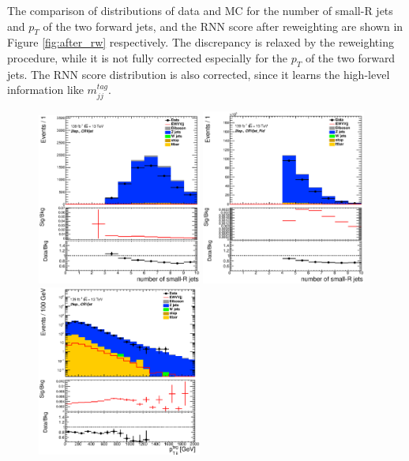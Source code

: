 The comparison of distributions of data and MC for the number of small-R jets and $p_T$ of the two forward jets, and the RNN score after reweighting are shown in Figure \ref{fig:after_rw}
respectively. The discrepancy is relaxed by the reweighting procedure, while it is not fully corrected especially for the $p_T$ of the two forward jets.
The RNN score distribution is also corrected, since it learns the high-level information like $m^{tag}_{jj}$.
\begin{figure}[ht]
    \centering
    \includegraphics[width=0.48\textwidth]{figures/2lep/reweighting/after_reweighting/C_0ptag1pfat0pjet_0ptv_CRVjet_NJets_Lin.eps}
    \includegraphics[width=0.48\textwidth]{figures/2lep/reweighting/after_reweighting/C_0ptag2pjet_0ptv_CRVjet_Fid_NJets_Lin.eps}
    \includegraphics[width=0.48\textwidth]{figures/2lep/reweighting/after_reweighting/C_0ptag1pfat0pjet_0ptv_CRVjet_PtTagMerJets_Log.eps}

\end{figure}
